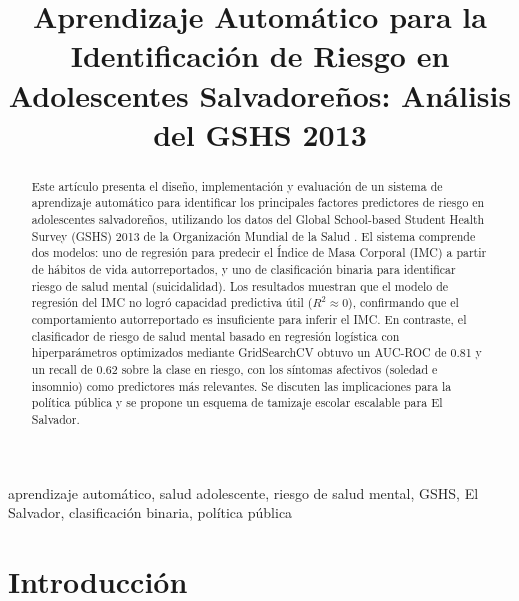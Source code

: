 \documentclass[conference]{IEEEtran}
\begin{document}
\title{Aprendizaje Automático para la Identificación de Riesgo en Adolescentes Salvadoreños: Análisis del GSHS 2013}

\author{
}

\maketitle

\begin{abstract}
  Este artículo presenta el diseño, implementación y evaluación de un sistema de aprendizaje automático para identificar los principales factores predictores de riesgo en adolescentes salvadoreños, utilizando los datos del Global School-based Student Health Survey (GSHS) 2013 de la Organización Mundial de la Salud \cite{who_gshs_2013}. El sistema comprende dos modelos: uno de regresión para predecir el Índice de Masa Corporal (IMC) a partir de hábitos de vida autorreportados, y uno de clasificación binaria para identificar riesgo de salud mental (suicidalidad). Los resultados muestran que el modelo de regresión del IMC no logró capacidad predictiva útil ($R^2 \approx 0$), confirmando que el comportamiento autorreportado es insuficiente para inferir el IMC. En contraste, el clasificador de riesgo de salud mental basado en regresión logística con hiperparámetros optimizados mediante GridSearchCV obtuvo un AUC-ROC de 0.81 y un recall de 0.62 sobre la clase en riesgo, con los síntomas afectivos (soledad e insomnio) como predictores más relevantes. Se discuten las implicaciones para la política pública y se propone un esquema de tamizaje escolar escalable para El Salvador.
\end{abstract}

\begin{IEEEkeywords}
  aprendizaje automático, salud adolescente, riesgo de salud mental, GSHS, El Salvador, clasificación binaria, política pública
\end{IEEEkeywords}

\section{Introducción}
\end{document}
